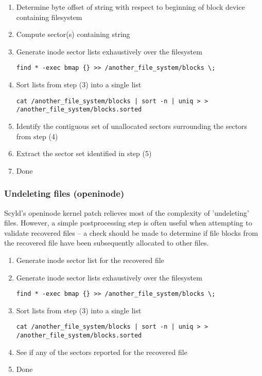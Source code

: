 \documentclass[letterpaper]{article}
\begin{document}
\begin{enumerate}
\item Determine byte offset of string with respect to beginning of block
device containing filesystem
\item Compute sector(s) containing string
\item Generate inode sector lists exhaustively over the filesystem
\begin{verbatim}
find * -exec bmap {} >> /another_file_system/blocks \;
\end{verbatim}
\item Sort lists from step (3) into a single list
\begin{verbatim}
cat /another_file_system/blocks | sort -n | uniq > > /another_file_system/blocks.sorted
\end{verbatim}
\item Identify the contiguous set of unallocated sectors surrounding
the sectors from step (4)
\item Extract the sector set identified in step (5)
\item Done
\end{enumerate}





\subsubsection{Undeleting files (openinode)}

Scyld's {\ttfamily openinode} kernel patch relieves most of the complexity
of 'undeleting' files. However, a simple postprocessing step is often
useful when attempting to validate recovered files -- a check should
be made to determine if file blocks from the recovered file have been
subsequently allocated to other files.

\begin{enumerate}
\item Generate inode sector list for the recovered file
\item Generate inode sector lists exhaustively over the filesystem
\begin{verbatim}
find * -exec bmap {} >> /another_file_system/blocks \;
\end{verbatim}
\item Sort lists from step (3) into a single list
\begin{verbatim}
cat /another_file_system/blocks | sort -n | uniq > > /another_file_system/blocks.sorted
\end{verbatim}
\item See if any of the sectors reported for the recovered file
\item Done      
\end{enumerate}
\end{document}
